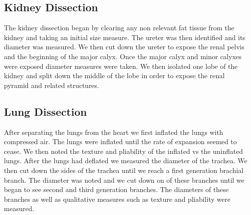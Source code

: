 \documentclass[12pt]{article}
\begin{document}
\subsection{Kidney Dissection}
\par{}
The kidney dissection began by clearing any non relevant fat tissue from the kidney and taking an initial size measure. The ureter was then identified and its diameter was measured. We then cut down the ureter to expose the renal pelvis and the beginning of the major calyx. Once the major calyx and minor calyxes were exposed diameter measures were taken. We then isolated one lobe of the kidney and split down the middle of the lobe in order to expose the renal pyramid and related structures.

\subsection{Lung Dissection}
\par{}
After separating the lungs from the heart we first inflated the lungs with compressed air. The lungs were inflated until the rate of expansion seemed to cease. We then noted the texture and pliability of the inflated vs the uninflated lungs. After the lungs had deflated we measured the diameter of the trachea. We then cut down the sides of the trachea until we reach a first generation brachial branch. The diameter was noted and we cut down on of these branches until we began to see second and third generation branches. The diameters of these branches as well as qualitative measures such as texture and pliability were measured.
\end{document}
